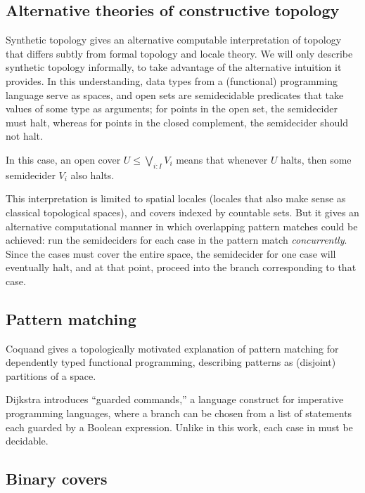 \documentclass[conference]{IEEEtran}
\begin{document}
\subsection{Alternative theories of constructive topology}

Synthetic topology gives an alternative computable interpretation of topology that differs subtly from formal topology and locale theory\cite{escardo2004, lesnik}. We will only describe synthetic topology informally, to take advantage of the alternative intuition it provides. In this understanding, data types from a (functional) programming language serve as spaces, and open sets are semidecidable predicates that take values of some type as arguments; for points in the open set, the semidecider must halt, whereas for points in the closed complement, the semidecider should not halt.

In this case, an open cover $U \le \bigvee_{i : I} V_i$ means that whenever $U$ halts, then some semidecider $V_i$ also halts.

This interpretation is limited to spatial locales (locales that also make sense as classical topological spaces), and covers indexed by countable sets. But it gives an alternative computational manner in which overlapping pattern matches could be achieved: run the semideciders for each case in the pattern match \emph{concurrently}. Since the cases must cover the entire space, the semidecider for one case will eventually halt, and at that point, proceed into the branch corresponding to that case.

\subsection{Pattern matching}

Coquand \cite{coquand1992} gives a topologically motivated explanation of pattern matching for dependently typed functional programming, describing patterns as (disjoint) partitions of a space.

Dijkstra \cite{dijkstra} introduces ``guarded commands,'' a language construct for imperative programming languages, where a branch can be chosen from a list of statements each guarded by a Boolean expression. Unlike in this work, each case in \cite{dijkstra} must be decidable.

\subsection{Binary covers}
\end{document}
